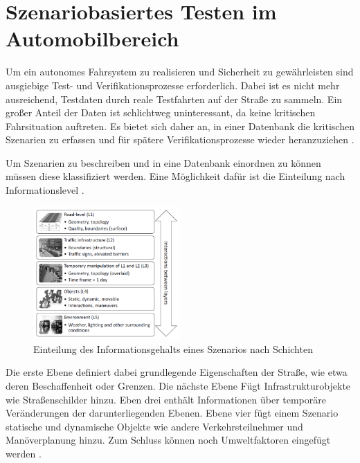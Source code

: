 \section{Szenariobasiertes Testen im Automobilbereich} \label{sec:SoftwaretestsAutomobil}

Um ein autonomes Fahrsystem zu realisieren und Sicherheit zu gewährleisten sind ausgiebige Test- und Verifikationsprozesse erforderlich. Dabei ist es nicht mehr ausreichend, Testdaten durch reale Testfahrten auf der Straße zu sammeln. Ein großer Anteil der Daten ist schlichtweg uninteressant, da keine kritischen Fahrsituation auftreten. Es bietet sich daher an, in einer Datenbank die kritischen Szenarien zu erfassen und für spätere Verifikationsprozesse wieder heranzuziehen \cite{Nalic2020}.

Um Szenarien zu beschreiben und in eine Datenbank einordnen zu können müssen diese klassifiziert werden. Eine Möglichkeit dafür ist die Einteilung nach Informationslevel \cite{Nalic2020}\cite{Bagschik2018}.
\begin{figure}[H]
    \centering
    \includegraphics[width=0.5\textwidth]{figures/2_Grundlagen/layer_model.png}
    \caption{Einteilung des Informationsgehalts eines Szenarios nach Schichten \cite{Bagschik2018}}
    \label{fig:layer_model}
\end{figure}
Die erste Ebene definiert dabei grundlegende Eigenschaften der Straße, wie etwa deren Beschaffenheit oder Grenzen. Die nächste Ebene Fügt Infrastrukturobjekte wie Straßenschilder hinzu. Eben drei enthält Informationen über temporäre Veränderungen der darunterliegenden Ebenen. Ebene vier fügt einem Szenario statische und dynamische Objekte wie andere Verkehrsteilnehmer und Manöverplanung hinzu. Zum Schluss können noch Umweltfaktoren eingefügt werden \cite{Bagschik2018}.

